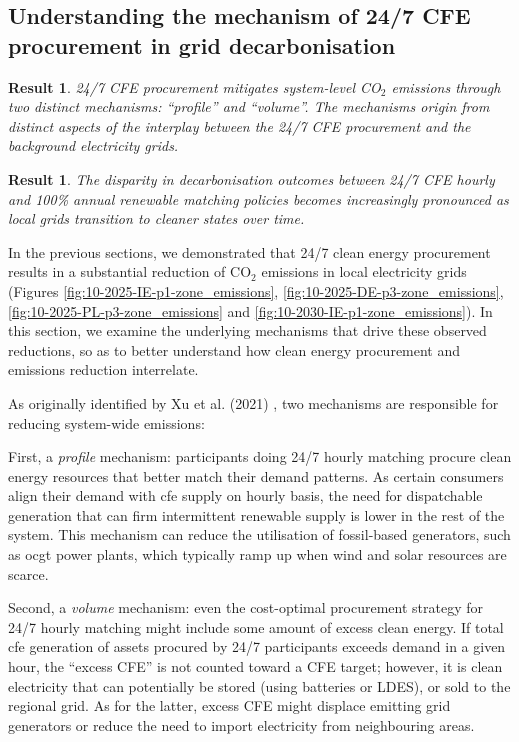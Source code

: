 \documentclass[11pt, 5p, nopreprintline]{elsarticle}
\newtheorem{res}[thm]{Result}  %
\begin{document}
\subsection{Understanding the mechanism of 24/7 CFE procurement in grid decarbonisation}
\label{subsec:mechanisms}

\begin{res}
    24/7 CFE procurement mitigates system-level CO$_2$ \newline
    emissions through two distinct mechanisms: \enquote{profile} and \enquote{volume}. The mechanisms origin from distinct aspects of the interplay between the 24/7 CFE procurement and the background electricity grids.
\end{res}

\begin{res}
    The disparity in decarbonisation outcomes between 24/7 CFE hourly and 100\% annual renewable matching policies becomes increasingly pronounced as local grids transition to cleaner states over time.
\end{res}

In the previous sections, we demonstrated that 24/7 clean energy procurement results in a substantial reduction of CO$_2$ emissions in local electricity grids (Figures \ref{fig:10-2025-IE-p1-zone_emissions}, \ref{fig:10-2025-DE-p3-zone_emissions}, \ref{fig:10-2025-PL-p3-zone_emissions} and \ref{fig:10-2030-IE-p1-zone_emissions}).
In this section, we examine the underlying mechanisms that drive these observed reductions, so as to better understand how clean energy procurement and emissions reduction interrelate.

As originally identified by Xu et al. (2021) \cite{xu-247CFE-report}, two mechanisms are responsible for reducing system-wide emissions:

First, a \textit{profile} mechanism: participants doing 24/7 hourly matching procure clean energy resources that better match their demand patterns.
As certain consumers align their demand with \gls{cfe} supply on hourly basis, the need for dispatchable generation that can firm intermittent renewable supply is lower in the rest of the system.
This mechanism can reduce the utilisation of fossil-based generators, such as \gls{ocgt} power plants, which typically ramp up when wind and solar resources are scarce.

Second, a \textit{volume} mechanism: even the cost-optimal procurement strategy for 24/7 hourly matching might include some amount of excess clean energy.
If total \gls{cfe} generation of assets procured by 24/7 participants exceeds demand in a given hour, the \enquote{excess CFE} is not counted toward a CFE target; however, it is clean electricity that can potentially be stored (using batteries or LDES), or sold to the regional grid.
As for the latter, excess CFE might displace emitting grid generators or reduce the need to import electricity from neighbouring areas.
\end{document}
